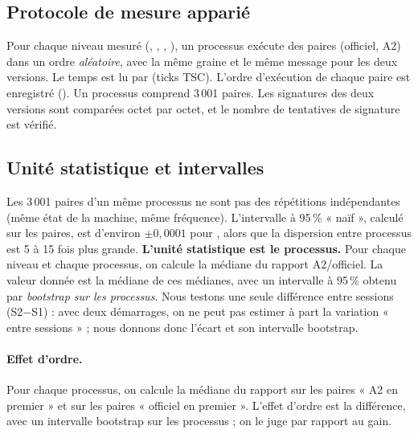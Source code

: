 \subsection{Protocole de mesure apparié}
Pour chaque niveau mesuré (, , , ), un processus exécute des paires (officiel, A2) dans un ordre \emph{aléatoire}, avec la même graine et le même message pour les deux versions. Le temps est lu par  (ticks TSC). L'ordre d'exécution de chaque paire est enregistré (). Un processus comprend 3\,001 paires. Les signatures des deux versions sont comparées octet par octet, et le nombre de tentatives de signature est vérifié.

\subsection{Unité statistique et intervalles}
Les 3\,001 paires d'un même processus ne sont pas des répétitions indépendantes (même état de la machine, même fréquence). L'intervalle à 95\,\% « naïf », calculé sur les paires, est d'environ $\pm0{,}0001$ pour , alors que la dispersion entre processus est 5 à 15 fois plus grande. \textbf{L'unité statistique est le processus.} Pour chaque niveau et chaque processus, on calcule la médiane du rapport A2/officiel. La valeur donnée est la médiane de ces médianes, avec un intervalle à 95\,\% obtenu par \emph{bootstrap sur les processus}. Nous testons une seule différence entre sessions (S2$-$S1) : avec deux démarrages, on ne peut pas estimer à part la variation « entre sessions » ; nous donnons donc l'écart et son intervalle bootstrap.

\paragraph{Effet d'ordre.} Pour chaque processus, on calcule la médiane du rapport sur les paires « A2 en premier » et sur les paires « officiel en premier ». L'effet d'ordre est la différence, avec un intervalle bootstrap sur les processus ; on le juge par rapport au gain.

